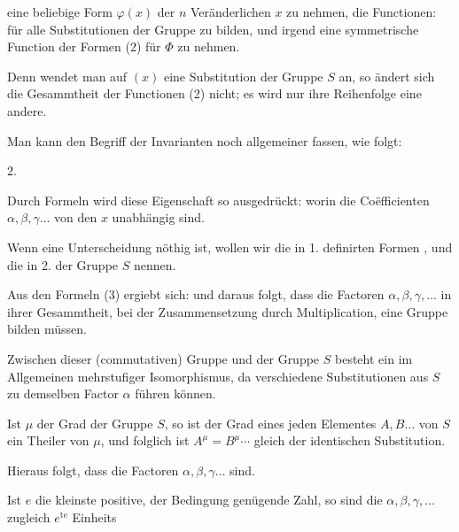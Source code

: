 eine beliebige Form $\varphi(x)$ der $n$ Veränderlichen $x$ zu nehmen,
die Functionen:
für alle Substitutionen der Gruppe zu bilden, und irgend eine
symmetrische Function der Formen (2) für $\Phi$ zu nehmen.

Denn wendet man auf $(x)$ eine Substitution der Gruppe $S$
an, so ändert sich die Gesammtheit der Functionen (2) nicht; es
wird nur ihre Reihenfolge eine andere.

Man kann den Begriff der Invarianten noch allgemeiner
fassen, wie folgt:

2. 

Durch Formeln wird diese Eigenschaft so ausgedrückt:
worin die Co\"efficienten $\alpha,\beta,\gamma\ldots$ von den $x$ unabhängig sind.

Wenn eine Unterscheidung n\"othig ist, wollen wir die in 1.
definirten Formen , und die in 2.  der Gruppe $S$ nennen.

Aus den Formeln (3) ergiebt sich:
und daraus folgt, dass die Factoren $\alpha,\beta,\gamma,\ldots$ in ihrer Gesammtheit,
bei der Zusammensetzung durch Multiplication, eine Gruppe
bilden müssen.

Zwischen dieser (commutativen) Gruppe und der Gruppe $S$
besteht ein im Allgemeinen mehrstufiger Isomorphismus, da
verschiedene Substitutionen aus $S$ zu demselben Factor $\alpha$ führen
können.

Ist $\mu$ der Grad der Gruppe $S$, so ist der Grad eines jeden
Elementes $A, B \ldots$ von $S$ ein Theiler von $\mu$, und folglich ist
$A^\mu = B^\mu \cdots$ gleich der identischen Substitution.

Hieraus folgt, dass die Factoren $\alpha,\beta,\gamma\ldots$  sind.

Ist $e$ die kleinste positive, der Bedingung
genügende Zahl, so sind die $\alpha, \beta, \gamma, \ldots$ zugleich $e^{\mathrm{te}}$ Einheits
